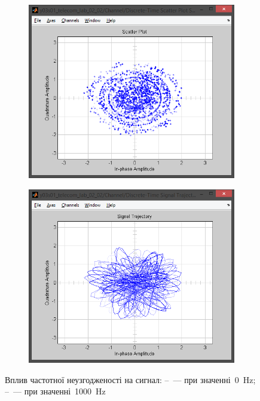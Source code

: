 \documentclass[
	a4paper,
	oneside,
	BCOR = 10mm,
	DIV = 12,
	12pt,
	headings = normal,
]{scrartcl}
\begin{document}
\begin{figure}[!htbp]
\begin{subfigure}{\textwidth / 3}
						\caption{}
						\label{subfig:freqshift-eye-out}
					\end{subfigure}%
					\begin{subfigure}{\textwidth / 3}
						\centering
						\includegraphics[height = 7\baselineskip]{../01-solution/02-freqshift-1000-hz-channel-scatter-plot.png}
						\caption{}
						\label{subfig:freqshift-signal-trajectory-out}
					\end{subfigure}%
					\begin{subfigure}{\textwidth / 3}
						\centering
						\includegraphics[height = 7\baselineskip]{../01-solution/02-freqshift-1000-hz-channel-signal-trajectory.png}
						\caption{}
						\label{subfig:freqshift-scatter-plot-out}
					\end{subfigure}%
					\caption{Вплив частотної неузгодженості на сигнал: –~— при значенні~\SI{0}{\hertz}; –~— при значенні~\SI{1000}{\hertz}}
					\label{fig:freqshift-plots}
				\end{figure}
\end{document}
